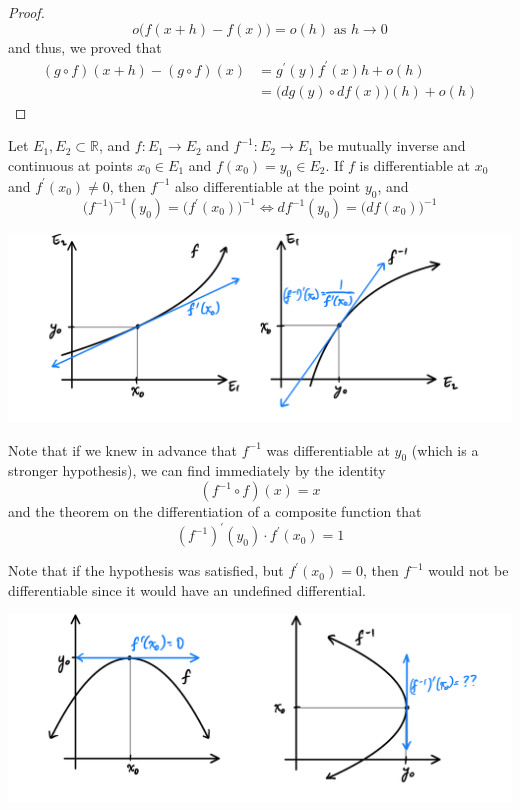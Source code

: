 \begin{proof}
    \[o\big(f(x + h) - f(x) \big) = o(h) \text{ as } h \rightarrow 0\]
    and thus, we proved that
    \begin{align*}
        (g \circ f)(x + h) - (g \circ f)(x) & = g^\prime (y) f^\prime (x) h + o(h) \\
        & = \big(dg(y) \circ df(x)\big) (h) + o(h)
    \end{align*}
    \end{proof}

    \begin{theorem}
    Let $E_1, E_2 \subset \mathbb{R}$, and $f: E_1 \longrightarrow E_2$ and $f^{-1}: E_2 \longrightarrow E_1$ be mutually inverse and continuous at points $x_0 \in E_1$ and $f(x_0) = y_0 \in E_2$. If $f$ is differentiable at $x_0$ and $f^\prime(x_0) \neq 0$, then $f^{-1}$ also differentiable at the point $y_0$, and 
    \[\big(f^{-1}\big)^{-1} (y_0) = \big(f^\prime (x_0)\big)^{-1} \iff df^{-1} (y_0) = \big(df(x_0)\big)^{-1}\]
    \begin{center}
        \includegraphics[scale=0.25]{img/Real_Analysis_Differentiation_Inverse_Functions.PNG}
    \end{center}
    Note that if we knew in advance that $f^{-1}$ was differentiable at $y_0$ (which is a stronger hypothesis), we can find immediately by the identity 
    \[(f^{-1} \circ f) (x) = x\]  
    and the theorem on the differentiation of a composite function that
    \[(f^{-1})^\prime (y_0) \cdot f^\prime (x_0) = 1\]
    \end{theorem}

    Note that if the hypothesis was satisfied, but $f^\prime (x_0) = 0$, then $f^{-1}$ would not be differentiable since it would have an undefined differential. 
    \begin{center}
        \includegraphics[scale=0.3]{img/Inverse_Function_Differentiation_Derivative_Zero_problem.PNG}
    \end{center}
